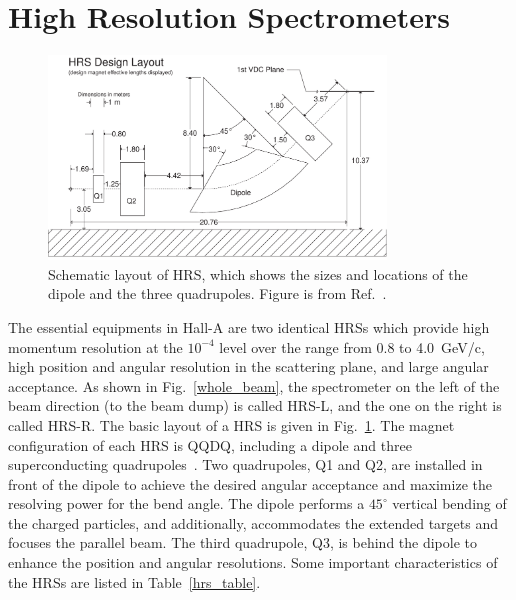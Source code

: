 \section{High Resolution Spectrometers}
\begin{figure}[!ht]
 \begin{center}
  \includegraphics[width=0.8\textwidth]{./figures/halla_jlab/spectro}
  \caption[Schematic layout of HRS]{\footnotesize{Schematic layout of HRS, which shows the sizes and locations of the dipole and the three quadrupoles. Figure is from Ref.~\cite{halla_nim}.}}
  \label{halla_spectro}
 \end{center}
 \end{figure}
The essential equipments in Hall-A are two identical HRSs which provide high momentum resolution at the $\mathrm{10^{-4}}$ level over the range from 0.8 to 4.0~GeV/c, high position and angular resolution in the scattering plane, and large angular acceptance. As shown in Fig.~\ref{whole_beam}, the spectrometer on the left of the beam direction (to the beam dump) is called HRS-L, and the one on the right is called HRS-R. The basic layout of a HRS is given in Fig.~\ref{halla_spectro}. The magnet configuration of each HRS is QQDQ, including a dipole and three superconducting quadrupoles~\cite{halla_nim}. Two quadrupoles, Q1 and Q2, are installed in front of the dipole to achieve the desired angular acceptance and maximize the resolving power for the bend angle. The dipole performs a $\mathrm{45^{\circ}}$ vertical bending of the charged particles, and additionally, accommodates the extended targets and focuses the parallel beam. The third quadrupole, Q3, is behind the dipole to enhance the position and angular resolutions. Some important characteristics of the HRSs are listed in Table~\ref{hrs_table}.
